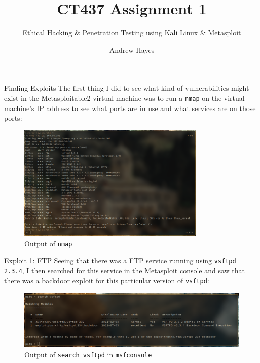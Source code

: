 \documentclass[]{beamer}
\author{Andrew Hayes }
\title{CT437 Assignment 1}
\subtitle{Ethical Hacking \& Penetration Testing using Kali Linux \& Metasploit}
\institute{Student ID: 21321503}
\begin{document}
\frame{\titlepage}

\begin{frame}{Finding Exploits}
    The first thing I did to see what kind of vulnerabilities might exist in the Metasploitable2 virtual machine was to run a \texttt{nmap} on the virtual machine's IP address to see what ports are in use and what services are on those ports:

\begin{figure}[H]
    \centering
    \includegraphics[width=0.8\textwidth]{./images/nmap.png}
    \caption{Output of \texttt{nmap}}
\end{figure}
\end{frame}

\begin{frame}{Exploit 1: FTP}
    Seeing that there was a FTP service running using \texttt{vsftpd 2.3.4}, I then searched for this service in the Metasploit console and saw that there was a backdoor exploit for this particular version of \texttt{vsftpd}:

\begin{figure}[H]
    \centering
    \includegraphics[width=\textwidth]{./images/searchftp.png}
    \caption{Output of \texttt{search vsftpd} in \texttt{msfconsole}}
\end{figure}
\end{frame}
\end{document}
